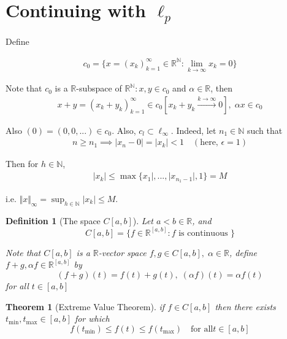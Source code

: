 \documentclass[11pt, oneside]{book}
\theoremstyle{break}
\newtheorem{thm}{Theorem}[section]
\newtheorem{defn}{Definition}[section]
\newcommand{\bb}[1]{\mathbb{#1}}			%
\begin{document}
\section{Continuing with \texorpdfstring{$\ell_p$}{lp}}\label{sect:l_p space cont}

Define

\begin{gather*}
	c_0 = \{x = (x_k)_{k = 1}^\infty \in \bb{R}^\bb{N} : \lim_{k \to \infty} x_k = 0 \}
\end{gather*}

Note that $c_0$  is a $\bb{R}$-subspace of $\bb{R}^\bb{N} : x, y \in c_0$ and $\alpha \in \bb{R}$, then
\begin{gather*}
	x + y = (x_k + y_k)_{k = 1}^\infty \in c_0 \left[ x_k + y_k \overset{k \to \infty}{\to} 0 \right], \; \alpha x \in c_0
\end{gather*}

Also $(0) = (0, 0, ... ) \in c_0$. Also, $c_l \subset \ell_\infty$. Indeed, let $n_1 \in \bb{N}$ such that
\begin{gather*}
	n \geq n_1 \implies |x_n - 0| = |x_k| < 1 \quad (\text{here, } \epsilon = 1)
\end{gather*}

Then for $h \in \bb{N}$,
\begin{gather*}
	|x_k| \leq \max\{x_1|, ..., |x_{n_1 - 1}|, 1 \} = M
\end{gather*}

i.e. $\Vert x\Vert _\infty = \sup_{h \in \bb{N}} |x_k| \leq M$.

\begin{defn}[The space \texorpdfstring{$C[a, b]$}{}]
	Let $a < b \in \bb{R}$, and
	\begin{equation}
		C[a, b] = \{f \in \bb{R}^{[a,b]} : f \text{ is continuous } \}
	\end{equation}

	Note that $C[a, b]$ is a $\bb{R}$-vector space $f, g \in C[a, b], \; \alpha \in \bb{R}$, define $f + g, \alpha f \in \bb{R}^{[a,b]}$ by
	\begin{equation}
		(f+g)(t) = f(t) + g(t), \; (\alpha f)(t) = \alpha f(t)
	\end{equation}
	for all $t \in [a, b]$
\end{defn}

\begin{thm}[Extreme Value Theorem]\label{thm:evt}
	if $f \in C[a,b]$ then there exists $t_{\min}, t_{\max} \in [a, b]$ for which
	\begin{equation}
		f(t_{\min}) \leq f(t) \leq f(t_{\max}) \quad \text{for all} t \in [a, b]
	\end{equation}
\end{thm}
\end{document}
